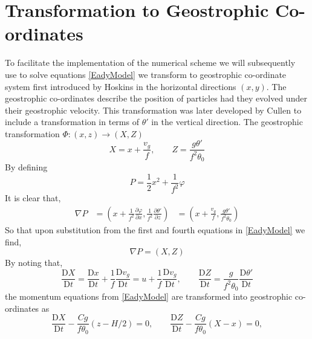 \section{Transformation to Geostrophic Co-ordinates \label{transformation}}
To facilitate the implementation of the numerical scheme we will subsequently use to solve equations \ref{EadyModel} we transform to geostrophic co-ordinate system first introduced by Hoskins \cite{Hoskins1975} in the horizontal directions $(x,y)$. The geostrophic co-ordinates describe the position of particles had they evolved under their geostrophic velocity. This transformation was later developed by Cullen \cite{Cullen2006a} to include a transformation in terms of $\theta '$ in the vertical direction. The geostrophic transformation $\Phi: (x,z) \rightarrow (X,Z)$
\begin{equation}
X = x + \frac{v_g}{f}, \qquad Z = \frac{g\theta'}{f^2\theta_0}
\end{equation}
By defining
\begin{equation}
P = \frac{1}{2}x^2 + \frac{1}{f^2}\varphi
\label{P}
\end{equation}
It is clear that,
\begin{equation*}
\begin{aligned}
\nabla P &= \left(x + \frac{1}{f^2}\frac{\partial \varphi}{\partial x}, \frac{1}{f^2} \frac{\partial \theta'}{\partial z}\right)
&= \left(x + \frac{v_g}{f}, \frac{g\theta'}{f^2\theta_0}\right)
\end{aligned}
\end{equation*}
So that upon substitution from the first and fourth equations in \ref{EadyModel} we find,
\begin{equation}
\nabla P = (X,Z)
\label{gradP}
\end{equation}
By noting that,
\begin{equation*}
\frac{\mathrm{D}X}{\mathrm{D}t} = \frac{\mathrm{D}x}{\mathrm{D}t} + \frac{1}{f}\frac{\mathrm{D}v_g}{\mathrm{D}t} = u + \frac{1}{f}\frac{\mathrm{D}v_g}{\mathrm{D}t}, \qquad \frac{\mathrm{D}Z}{\mathrm{D}t} = \frac{g}{f^2\theta_0} \frac{\mathrm{D}\theta '}{\mathrm{D}t}
\end{equation*}
the momentum equations from \ref{EadyModel} are transformed into geostrophic co-ordinates as
\begin{equation}
\frac{\mathrm{D}X}{\mathrm{D}t} -\frac{Cg}{f\theta _0}\left(z-H/2\right) = 0,\qquad
\frac{\mathrm{D}Z}{\mathrm{D}t} - \frac{Cg}{f\theta_0}\left(X - x\right) = 0,
\label{Gmom}
\end{equation}
